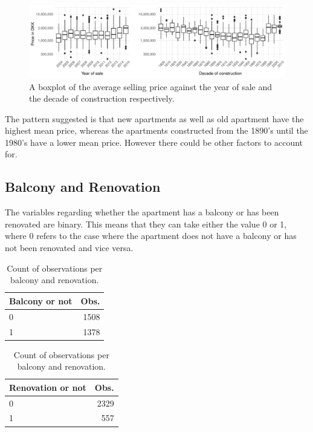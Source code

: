 \begin{figure}[H]
    \centering
    \includegraphics[width = \textwidth]{figures/Data_introduction/house_price_year.pdf}
    \caption{A boxplot of the average selling price against the year of sale and the decade of construction respectively.}
    \label{fig:house_price_year}
\end{figure}
The pattern suggested is that new apartments as well as old apartment have the highest mean price, whereas the apartments constructed from the 1890's until the 1980's have a lower mean price.
However there could be other factors to account for.

\subsection*{Balcony and Renovation}
The variables regarding whether the apartment has a balcony or has been renovated are binary.
This means that they can take either the value 0 or 1, where 0 refers to the case where the apartment does not have a balcony or has not been renovated and vice versa.
\begin{table}[H]
    \centering
    \begin{tabular}{lr}
        \toprule
        \textbf{Balcony or not} & \textbf{Obs.}\\
        \midrule
        0 & 1508\\
        1 & 1378\\
        \bottomrule
    \end{tabular}
    \hspace{20pt}
    \begin{tabular}{lr}
        \toprule
        \textbf{Renovation or not} & \textbf{Obs.}\\
        \midrule
        0 & 2329\\
        1 & 557\\
        \bottomrule
    \end{tabular}
    \caption{Count of observations per balcony and renovation.}
\end{table}

